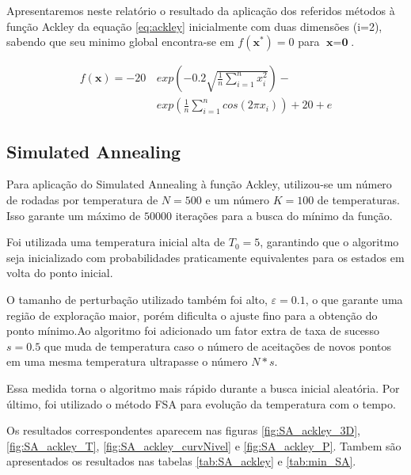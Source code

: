 \documentclass[conference,compsoc]{IEEEtran}
\begin{document}
Apresentaremos neste relatório o resultado da aplicação dos referidos métodos à função Ackley da equação \ref{eq:ackley} inicialmente com duas dimensões (i=2), sabendo que seu minimo global encontra-se em $f(\textbf{x}^*)=0$ para $\textbf{x}=\textbf{0}$.

 \begin{equation}
 \begin{split}
f(\textbf{x}) =  -20\, & exp\left (-0.2 \sqrt{\frac{1}{n} \sum_{i=1}^n x_i^2} \right) -\\
		              & exp \left( \frac{1}{n} \sum_{i=1}^n cos(2\pi x_i) \right) + 20 + e
 \label{eq:ackley}
 \end{split}
 \end{equation} 
 
 \subsection{Simulated Annealing}

Para aplicação do Simulated Annealing à função Ackley, utilizou-se um número de rodadas por temperatura de $N=500$ e um número $K=100$ de temperaturas. Isso garante um máximo de $50000$ iterações para a busca do mínimo da função.

Foi utilizada uma temperatura inicial alta de $T_0=5$, garantindo que o algoritmo seja inicializado com probabilidades praticamente equivalentes para os estados em volta do ponto inicial.

O tamanho de perturbação utilizado também foi alto, $\varepsilon=0.1$, o que garante uma região de exploração maior, porém dificulta o ajuste fino para a obtenção do ponto mínimo.Ao algoritmo foi adicionado um fator extra de taxa de sucesso $s=0.5$ que muda de temperatura caso o número de aceitações de novos pontos em uma mesma temperatura ultrapasse o número $N*s$. 

Essa medida torna o algoritmo mais rápido durante a busca inicial aleatória. Por último, foi utilizado o método FSA para evolução da temperatura com o tempo.

Os resultados correspondentes aparecem nas figuras \ref{fig:SA_ackley_3D}, \ref{fig:SA_ackley_T}, \ref{fig:SA_ackley_curvNivel} e \ref{fig:SA_ackley_P}. Tambem são apresentados os resultados nas tabelas \ref{tab:SA_ackley} e \ref{tab:min_SA}.
\end{document}
